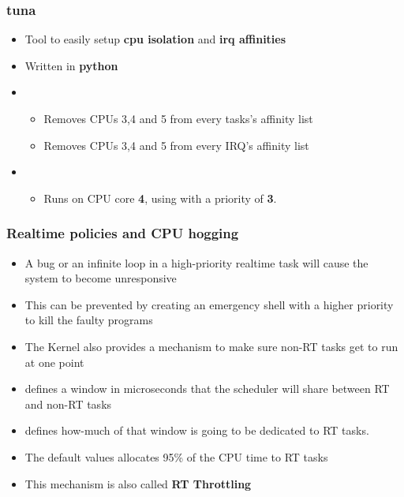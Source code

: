 \begin{frame}
	\frametitle{tuna}
	\begin{itemize}
		\item Tool to easily setup \textbf{cpu isolation} and \textbf{irq affinities}
		\item Written in \textbf{python}
		\item {}
			\begin{itemize}
				\item Removes CPUs 3,4 and 5 from every tasks's affinity list
				\item Removes CPUs 3,4 and 5 from every IRQ's affinity list
			\end{itemize}
		\item {}
			\begin{itemize}
				\item Runs  on CPU core \textbf{4}, using  with a priority of \textbf{3}.
			\end{itemize}
	\end{itemize}
\end{frame}



\begin{frame}
	\frametitle{Realtime policies and CPU hogging}
	\begin{itemize}
		\item A bug or an infinite loop in a high-priority realtime task will cause the system to become unresponsive
		\item This can be prevented by creating an emergency shell with a higher priority to kill the faulty programs
		\item The Kernel also provides a mechanism to make sure non-RT tasks get to run at one point
		\item {} defines a window in microseconds that the scheduler will share between RT and non-RT tasks
		\item {} defines how-much of that window is going to be dedicated to RT tasks.
		\item The default values allocates 95\% of the CPU time to RT tasks
		\item This mechanism is also called \textbf{RT Throttling}
	\end{itemize}
\end{frame}

